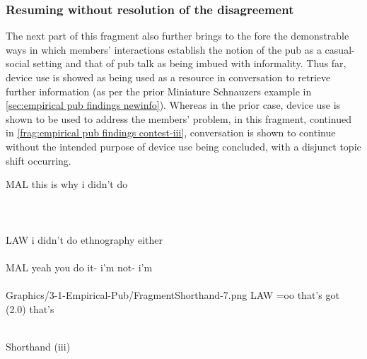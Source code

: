 \subsubsection{Resuming without resolution of the disagreement}\label{sec:empirical pub findings contest resuming}
\begin{revisedsubmission}
The next part of this fragment also further brings to the fore the demonstrable ways in which members' interactions establish the notion of the pub as a casual-social setting and that of pub talk as being imbued with informality.
Thus far, device use is showed as being used as a resource in conversation to retrieve further information (as per the prior Miniature Schnauzers example in \ref{sec:empirical pub findings newinfo}).
Whereas in the prior case, device use is shown to be used to address the members' problem, in this fragment, continued in \autoref{frag:empirical pub findings contest-iii}, conversation is shown to continue without the intended purpose of device use being concluded, with a disjunct topic shift occurring.

\begin{inlinefrag*}
    {
    \begin{transcript*}[32]
        \by MAL {this is why i didn't do} \\
         \\
         \\
         \\
        \by LAW {i didn't do ethnography either} \\
         \\
        \by MAL {yeah\intUp{} you do it- i'm not- i'm} \\
         \\ \newpage 
           {Graphics/3-1-Empirical-Pub/FragmentShorthand-7.png}
        \by LAW {=oo\intUp{} that's got (2.0) that's} \\
         \\
    \end{transcript*}
    \caption{Shorthand (iii)}\label{frag:empirical pub findings contest-iii}
    }
\end{inlinefrag*}


\end{revisedsubmission}
